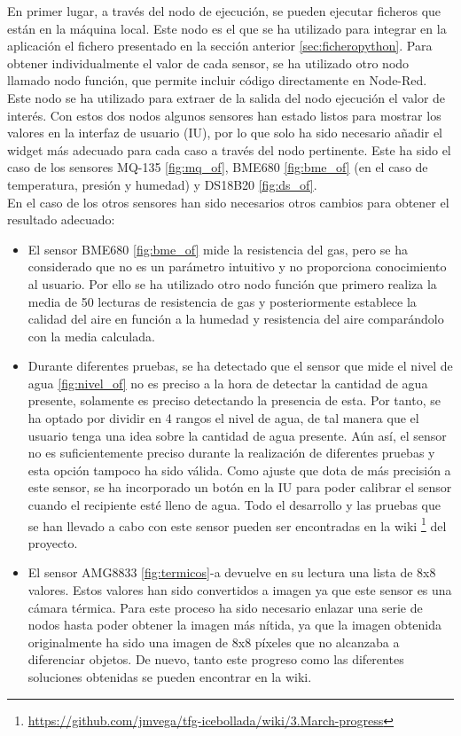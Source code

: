 En primer lugar, a través del nodo de ejecución, se pueden ejecutar ficheros que están en la máquina local. Este nodo es el que se ha utilizado para integrar en la aplicación el fichero presentado en la sección anterior \ref{sec:ficheropython}. Para obtener individualmente el valor de cada sensor, se ha utilizado otro nodo llamado nodo función, que permite incluir código directamente en Node-Red. Este nodo se ha utilizado para extraer de la salida del nodo ejecución el valor de interés. Con estos dos nodos algunos sensores han estado listos para mostrar los valores en la interfaz de usuario (IU), por lo que solo ha sido necesario añadir el widget más adecuado para cada caso a través del nodo pertinente. Este ha sido el caso de los sensores MQ-135 \ref{fig:mq_of}, BME680 \ref{fig:bme_of} (en el caso de temperatura, presión y humedad) y DS18B20 \ref{fig:ds_of}.\\

En el caso de los otros sensores han sido necesarios otros cambios para obtener el resultado adecuado:
\begin{itemize}
	\item El sensor BME680 \ref{fig:bme_of} mide la resistencia del gas, pero se ha considerado que no es un parámetro intuitivo y no proporciona conocimiento al usuario. Por ello se ha utilizado otro nodo función que primero realiza la media de 50 lecturas de resistencia de gas y posteriormente establece la calidad del aire en función a la humedad y resistencia del aire comparándolo con la media calculada.
	
	\item Durante diferentes pruebas, se ha detectado que el sensor que mide el nivel de agua \ref{fig:nivel_of} no es preciso a la hora de detectar la cantidad de agua presente, solamente es preciso detectando la presencia de esta. Por tanto, se ha optado por dividir en 4 rangos el nivel de agua, de tal manera que el usuario tenga una idea sobre la cantidad de agua presente. Aún así, el sensor no es suficientemente preciso durante la realización de diferentes pruebas y esta opción tampoco ha sido válida. Como ajuste que dota de más precisión a este sensor, se ha incorporado un botón en la IU para poder calibrar el sensor cuando el recipiente esté lleno de agua. Todo el desarrollo y las pruebas que se han llevado a cabo con este sensor pueden ser encontradas en la wiki \footnote{\url{https://github.com/jmvega/tfg-icebollada/wiki/3.March-progress}} del proyecto.
	
	\item El sensor AMG8833 \ref{fig:termicos}-a devuelve en su lectura una lista de 8x8 valores. Estos valores han sido convertidos a imagen ya que este sensor es una cámara térmica. Para este proceso ha sido necesario enlazar una serie de nodos hasta poder obtener la imagen más nítida, ya que la imagen obtenida originalmente ha sido una imagen de 8x8 píxeles que no alcanzaba a diferenciar objetos. De nuevo, tanto este progreso como las diferentes soluciones obtenidas se pueden encontrar en la wiki. 
\end{itemize}

